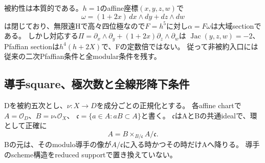 被約性は本質的である。$h=1$のaffine座標$(x,y,z,w)$で
\[
 \omega=(1+2x)\,dx\wedge dy+dz\wedge dw
\]
は閉じており、無限遠Hで高々四位極なので$F=h^5$に対し$\alpha=F\omega$は大域sectionである。
しかし対応する$\Pi=\partial_x\wedge\partial_y+(1+2x)\partial_z\wedge\partial_w$は
$\operatorname{Jac}(y,z,w)=-2$、Pfaffian sectionは$h^4(h+2X)$で、Fの定数倍ではない。
従って非被約入口には従来の二次Pfaffian条件と全modular条件を残す。

\subsection{導手square、極次数と全線形降下条件}
Dを被約五次とし、$\nu:X\to D$を成分ごとの正規化とする。
各affine chartで$A=\mathcal O_D$、$B=\nu_*\mathcal O_X$、
$\mathfrak c=\{a\in A:aB\subset A\}$と書く。
$\mathfrak c$はAとBの共通idealで、環として正確に
\begin{equation}
 A=B\mathbin{\times}_{B/\mathfrak c}A/\mathfrak c .\label{eq:conductor-square}
\end{equation}
Bの元は、そのmodulo導手の像が$A/\mathfrak c$に入る時かつその時だけAへ降りる。
導手のscheme構造をreduced supportで置き換えていない。

